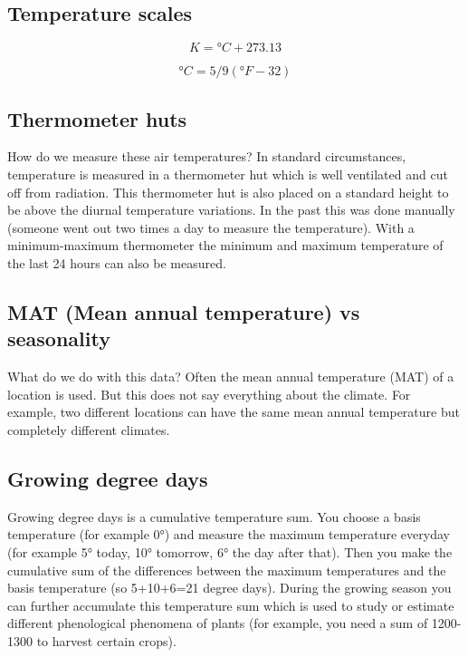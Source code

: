 \documentclass[oneside]{book}
\begin{document}
\subsection{Temperature scales}\label{temperature-scales}

\begin{equation} 
   K = °C + 273.13
   \label{eq:EqK}
\end{equation}

\begin{equation} 
   °C = 5/9 \left(°F - 32 \right)
   \label{eq:EqF}
\end{equation}

\subsection{Thermometer huts}\label{thermometer-huts}

How do we measure these air temperatures? In standard circumstances,
temperature is measured in a thermometer hut which is well ventilated
and cut off from radiation. This thermometer hut is also placed on a
standard height to be above the diurnal temperature variations. In the
past this was done manually (someone went out two times a day to measure
the temperature). With a minimum-maximum thermometer the minimum and
maximum temperature of the last 24 hours can also be measured.

\subsection{MAT (Mean annual temperature) vs
seasonality}\label{mat-mean-annual-temperature-vs-seasonality}

What do we do with this data? Often the mean annual temperature (MAT) of
a location is used. But this does not say everything about the climate.
For example, two different locations can have the same mean annual
temperature but completely different climates.

\subsection{Growing degree days}\label{growing-degree-days}

Growing degree days is a cumulative temperature sum. You choose a basis
temperature (for example 0°) and measure the maximum temperature
everyday (for example 5° today, 10° tomorrow, 6° the day after that).
Then you make the cumulative sum of the differences between the maximum
temperatures and the basis temperature (so 5+10+6=21 degree days).
During the growing season you can further accumulate this temperature
sum which is used to study or estimate different phenological phenomena
of plants (for example, you need a sum of 1200-1300 to harvest certain
crops).
\end{document}

